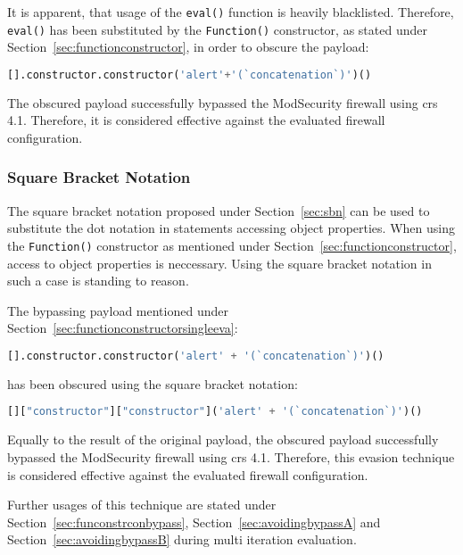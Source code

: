It is apparent, that usage of the \verb|eval()| function is heavily blacklisted. Therefore, \verb|eval()| has been substituted by the \verb|Function()| constructor, as stated under Section~\ref{sec:functionconstructor}, in order to obscure the payload:

\begin{lstlisting}[style=basicStyle, language=Python, caption=Function() constructor bypass, label={lst:funconbypass}]
[].constructor.constructor('alert'+'(`concatenation`)')()
\end{lstlisting}

The obscured payload successfully bypassed the ModSecurity firewall using \acrshort{crs} 4.1. Therefore, it is considered effective against the evaluated firewall configuration.

\subsubsection{Square Bracket Notation}
\label{sec:functionconstructorsingleevasbn}
The square bracket notation proposed under Section~\ref{sec:sbn} can be used to substitute the dot notation in statements accessing object properties. When using the \verb|Function()| constructor as mentioned under Section~\ref{sec:functionconstructor}, access to object properties is neccessary. Using the square bracket notation in such a case is standing to reason.

The bypassing payload mentioned under Section~\ref{sec:functionconstructorsingleeva}:

\begin{lstlisting}[style=basicStyle, language=Python]
[].constructor.constructor('alert' + '(`concatenation`)')()
\end{lstlisting}

has been obscured using the square bracket notation:

\begin{lstlisting}[style=basicStyle, language=Python, caption=square bracket notation bypass]
[]["constructor"]["constructor"]('alert' + '(`concatenation`)')()
\end{lstlisting}

Equally to the result of the original payload, the obscured payload successfully bypassed the ModSecurity firewall using \acrshort{crs} 4.1. Therefore, this evasion technique is considered effective against the evaluated firewall configuration.

Further usages of this technique are stated under Section~\ref{sec:funconstrconbypass}, Section~\ref{sec:avoidingbypassA} and Section~\ref{sec:avoidingbypassB} during multi iteration evaluation.


